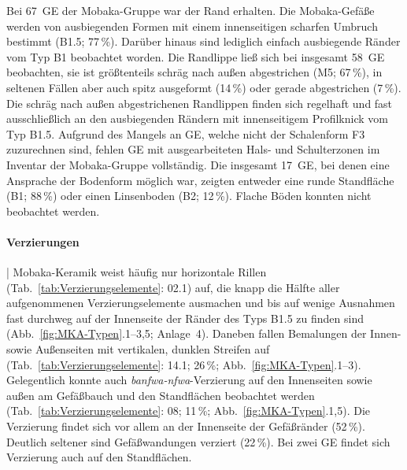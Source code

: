 Bei 67~GE der Mobaka-Gruppe war der Rand erhalten. Die Mobaka-Gefäße werden von ausbiegenden Formen mit einem innenseitigen scharfen Umbruch bestimmt (B1.5; 77\,\%). Darüber hinaus sind lediglich einfach ausbiegende Ränder vom Typ B1 beobachtet worden. Die Randlippe ließ sich bei insgesamt 58~GE beobachten, sie ist größtenteils schräg nach außen abgestrichen (M5; 67\,\%), in seltenen Fällen aber auch spitz ausgeformt (14\,\%) oder gerade abgestrichen (7\,\%). Die schräg nach außen abgestrichenen Randlippen finden sich regelhaft und fast ausschließlich an den ausbiegenden Rändern mit innenseitigem Profilknick vom Typ B1.5. Aufgrund des Mangels an GE, welche nicht der Schalenform F3 zuzurechnen sind, fehlen GE mit ausgearbeiteten Hals- und Schulterzonen im Inventar der Mobaka-Gruppe vollständig. Die insgesamt 17~GE, bei denen eine Ansprache der Bodenform möglich war, zeigten entweder eine runde Standfläche (B1; 88\,\%) oder einen Linsenboden (B2; 12\,\%). Flache Böden konnten nicht beobachtet werden.

\paragraph{Verzierungen}\hspace{-.5em}|\hspace{.5em}%
Mobaka-Keramik weist häufig nur horizontale Rillen (Tab.~\ref{tab:Verzierungselemente}: 02.1) auf, die knapp die Hälfte aller aufgenommenen Verzierungselemente ausmachen und bis auf wenige Ausnahmen fast durchweg auf der Innenseite der Ränder des Typs B1.5 zu finden sind (Abb.~\ref{fig:MKA-Typen}.1--3,5; Anlage~4). Daneben fallen Bemalungen der Innen- sowie Außenseiten mit vertikalen, dunklen Streifen auf (Tab.~\ref{tab:Verzierungselemente}: 14.1; 26\,\%; Abb.~\ref{fig:MKA-Typen}.1--3). Gelegentlich konnte auch \textit{banfwa-nfwa}-Verzierung auf den Innenseiten sowie außen am Gefäßbauch und den Standflächen beobachtet werden (Tab.~\ref{tab:Verzierungselemente}: 08; 11\,\%; Abb.~\ref{fig:MKA-Typen}.1,5). Die Verzierung findet sich vor allem an der Innenseite der Gefäßränder (52\,\%). Deutlich seltener sind Gefäßwandungen verziert (22\,\%). Bei zwei GE findet sich Verzierung auch auf den Standflächen.

